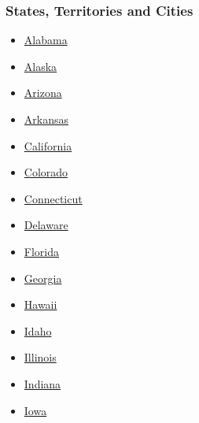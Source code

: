\hypertarget{states-territories-and-cities}{%
\subsubsection{States, Territories and
Cities}\label{states-territories-and-cities}}

\begin{itemize}
\tightlist
\item
  \href{https://www.nytimes3xbfgragh.onion/interactive/2020/us/alabama-coronavirus-cases.html}{Alabama}
\item
  \href{https://www.nytimes3xbfgragh.onion/interactive/2020/us/alaska-coronavirus-cases.html}{Alaska}
\item
  \href{https://www.nytimes3xbfgragh.onion/interactive/2020/us/arizona-coronavirus-cases.html}{Arizona}
\item
  \href{https://www.nytimes3xbfgragh.onion/interactive/2020/us/arkansas-coronavirus-cases.html}{Arkansas}
\item
  \href{https://www.nytimes3xbfgragh.onion/interactive/2020/us/california-coronavirus-cases.html}{California}
\item
  \href{https://www.nytimes3xbfgragh.onion/interactive/2020/us/colorado-coronavirus-cases.html}{Colorado}
\item
  \href{https://www.nytimes3xbfgragh.onion/interactive/2020/us/connecticut-coronavirus-cases.html}{Connecticut}
\item
  \href{https://www.nytimes3xbfgragh.onion/interactive/2020/us/delaware-coronavirus-cases.html}{Delaware}
\item
  \href{https://www.nytimes3xbfgragh.onion/interactive/2020/us/florida-coronavirus-cases.html}{Florida}
\item
  \href{https://www.nytimes3xbfgragh.onion/interactive/2020/us/georgia-coronavirus-cases.html}{Georgia}
\item
  \href{https://www.nytimes3xbfgragh.onion/interactive/2020/us/hawaii-coronavirus-cases.html}{Hawaii}
\item
  \href{https://www.nytimes3xbfgragh.onion/interactive/2020/us/idaho-coronavirus-cases.html}{Idaho}
\item
  \href{https://www.nytimes3xbfgragh.onion/interactive/2020/us/illinois-coronavirus-cases.html}{Illinois}
\item
  \href{https://www.nytimes3xbfgragh.onion/interactive/2020/us/indiana-coronavirus-cases.html}{Indiana}
\item
  \href{https://www.nytimes3xbfgragh.onion/interactive/2020/us/iowa-coronavirus-cases.html}{Iowa}

\end{itemize}
